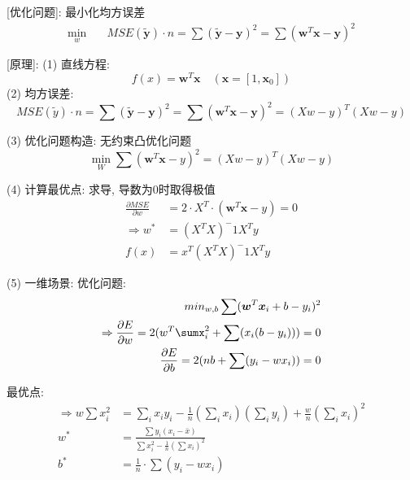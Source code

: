 \documentclass{article}
\begin{document}
		[优化问题]: 最小化均方误差
    		\begin{align*}
    			\min_w  &\quad	MSE(\tilde{\boldsymbol y}) · n = \sum (\tilde {\boldsymbol y} -\boldsymbol y)^2 = \sum (\boldsymbol w^T \boldsymbol x - \boldsymbol y)^2
    		\end{align*}
    		
		[原理]:
			(1) 直线方程: $$f(x) = \boldsymbol w^T \boldsymbol x	\quad (\boldsymbol x = [1, \boldsymbol x_0])$$
			(2) 均方误差:
					$$MSE(\tilde y) · n = \sum (\tilde {\boldsymbol y} -\boldsymbol y)^2 = \sum (\boldsymbol w^T \boldsymbol x - \boldsymbol y)^2 = (X w - y)^T (X w - y)$$
					
			(3) 优化问题构造: 无约束凸优化问题
					$$\min_W	\sum (\boldsymbol w^T \boldsymbol x - y)^2 = (X w - y)^T (X w - y)$$
					
			(4) 计算最优点: 求导, 导数为0时取得极值
				\begin{align*}
					\frac{\partial MSE}{\partial w} &= 2·X^T·(\boldsymbol w^T \boldsymbol x - y) = 0\\
				\Rightarrow	w^* &= (X^T X)^-1 X^T y\\
					f(x) &= x^T (X^T X)^-1 X^T y
				\end{align*}
				
			(5) 一维场景:
				优化问题:
				\begin{align*}
					min_{w,b}	\sum (\boldsymbol w^T \boldsymbol x_i + b - y_i)^2\\
				    \Rightarrow	\frac{\partial E}{\partial w} = 2( w^T \sumx_i^2 + \sum(x_i(b - y_i)) )	= 0\\
					\frac{\partial E}{\partial b} = 2( n b + \sum(y_i - w x_i) ) = 0
				\end{align*}
				
				最优点:
				\begin{align*}
				    \Rightarrow w \sum x_i^2 &= \sum_i x_i y_i - \frac{1}{n} \left(\sum_i x_i \right) \left(\sum_i y_i\right) + \frac{w}{n} \left(\sum_i x_i\right)^2\\
					w^* &= \frac{\sum y_i(x_i - \bar x)}{\sum x_i^2 - \frac{1}{n} (\sum x_i)^2}\\
					b^* &= \frac{1}{n}·\sum(y_i - w x_i)\\
				\end{align*}

					
\end{document}
